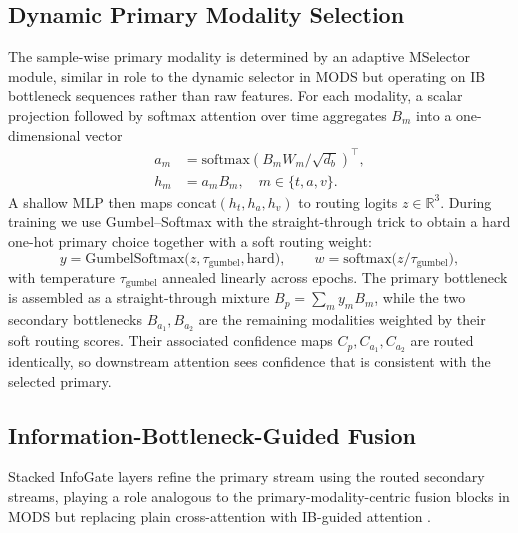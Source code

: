\documentclass[11pt]{article}
\begin{document}
\subsection{Dynamic Primary Modality Selection}
\label{sec:method-msel}
The sample-wise primary modality is determined by an adaptive MSelector
module, similar in role to the dynamic selector in MODS
\citep{mods2026align} but operating on IB bottleneck sequences rather than raw
features.
For each modality, a scalar projection followed by softmax attention over
time aggregates $B_m$ into a one-dimensional vector
\begin{equation}
\begin{split}
a_m &= \mathrm{softmax}(B_m W_m/\sqrt{d_b})^{\top},\\
h_m &= a_m B_m,\quad m\in\{t,a,v\}.
\end{split}
\end{equation}
A shallow MLP then maps $\mathrm{concat}(h_t, h_a, h_v)$ to routing logits
$z \in \mathbb{R}^3$. During training we use Gumbel--Softmax with the
straight-through trick \citep{jang2017gumbel} to obtain a hard one-hot primary
choice together with a soft routing weight:
\begin{equation}
  y = \mathrm{GumbelSoftmax}\!\bigl(z,\tau_{\mathrm{gumbel}},\mathrm{hard}\bigr),
  \qquad
  w = \mathrm{softmax}\!\bigl(z / \tau_{\mathrm{gumbel}}\bigr),
\end{equation}
with temperature $\tau_{\mathrm{gumbel}}$ annealed linearly across epochs.
The primary bottleneck is assembled as a straight-through mixture
$B_p = \sum_m y_m B_m$, while the two secondary bottlenecks
$B_{a_1}, B_{a_2}$ are the remaining modalities weighted by their soft routing
scores. Their associated confidence maps $C_p, C_{a_1}, C_{a_2}$ are routed
identically, so downstream attention sees confidence that is consistent with
the selected primary.

\subsection{Information-Bottleneck-Guided Fusion}
\label{sec:method-layer}
Stacked InfoGate layers refine the primary stream using the routed secondary
streams, playing a role analogous to the primary-modality-centric fusion
blocks in MODS but replacing plain cross-attention with IB-guided attention
\citep{alemi2017deep}.
\end{document}
